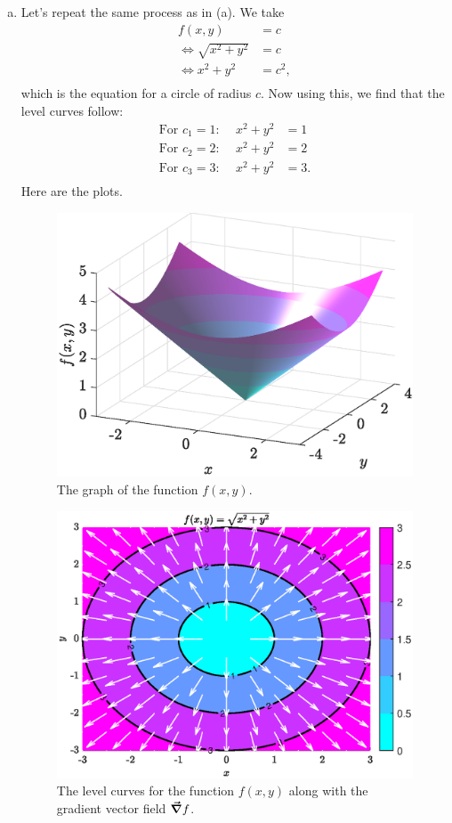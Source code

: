 \documentclass[12pt]{article} %
\begin{document}
\begin{solution}
\begin{enumerate}[(a)]
    \item Let's repeat the same process as in (a). We take
    \begin{align*}
        f(x,y)&=c\\
        \iff \sqrt{x^2+y^2}&= c\\
        \iff x^2+y^2&=c^2,\\
    \end{align*}
    which is the equation for a circle of radius $c$. Now using this, we find that the level curves follow:
    \begin{align*}
        \textrm{For $c_1=1$:~}\quad x^2+y^2&=1\\
        \textrm{For $c_2=2$:~}\quad x^2+y^2&=2\\
        \textrm{For $c_3=3$:~}\quad x^2+y^2&=3.\\
    \end{align*}
    Here are the plots.
    \begin{figure}[H]
        \centering
        \includegraphics[width=.65\textwidth]{figures/7b_surface}
        \caption{The graph of the function $f(x,y)$.}
    \end{figure}
    \begin{figure}[H]
        \centering
        \includegraphics[width=.65\textwidth]{figures/7b_contour}
        \caption{The level curves for the function $f(x,y)$ along with the gradient vector field $\boldsymbol{\vec{\nabla}} f$.}
    \end{figure}
    

\end{enumerate}
\end{solution}
\end{document}
